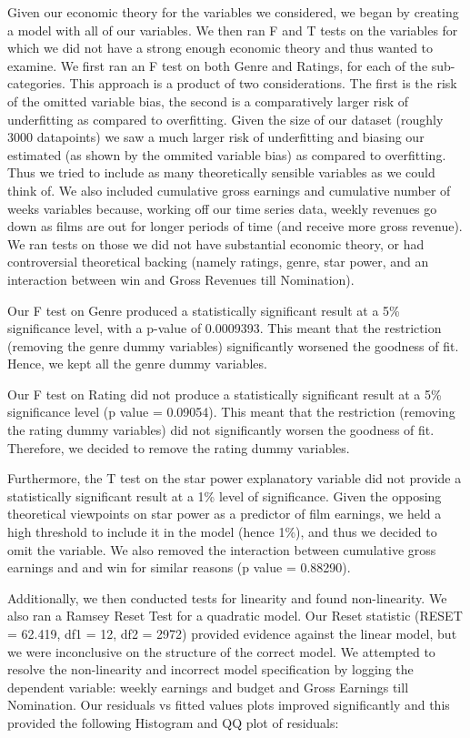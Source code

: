 \documentclass[10.7pt]{article} %
\begin{document}
Given our economic theory for the variables we considered, we began by creating a model with all of our variables. We then ran F and T tests on the variables for which we did not have a strong enough economic theory and thus wanted to examine. We first ran an F test on both Genre and Ratings, for each of the sub-categories. This approach is a product of two considerations. The first is the risk of the omitted variable bias, the second is a comparatively larger risk of underfitting as compared to overfitting. Given the size of our dataset (roughly 3000 datapoints) we saw a much larger risk of underfitting and biasing our estimated (as shown by the ommited variable bias) as compared to overfitting. Thus we tried to include as many theoretically sensible variables as we could think of. We also included cumulative gross earnings and cumulative number of weeks variables because, working off our time series data, weekly revenues go down as films are out for longer periods of time (and receive more gross revenue). We ran tests on those we did not have substantial economic theory, or had controversial theoretical backing  (namely ratings, genre, star power, and an interaction between win and Gross Revenues till Nomination).

Our F test on Genre produced a statistically significant result at a 5\% significance level, with a p-value of 0.0009393. This meant that the restriction (removing the genre dummy variables) significantly worsened the goodness of fit. Hence, we kept all the genre dummy variables. 

Our F test on Rating did not produce a statistically significant result at a 5\% significance level (p value = 0.09054). This meant that the restriction (removing the rating dummy variables) did not significantly worsen the goodness of fit. Therefore, we decided to remove the rating dummy variables. 

Furthermore, the T test on the star power explanatory variable did not provide a statistically significant result at a 1\% level of significance. Given the opposing theoretical viewpoints on star power as a predictor of film earnings, we held a high threshold to include it in the model (hence 1\%), and thus we decided to omit the variable. We also removed the interaction between cumulative gross earnings and and win for similar reasons (p value = 0.88290).

Additionally, we then conducted tests for linearity and found non-linearity. We also ran a Ramsey Reset Test for a quadratic model. Our Reset statistic (RESET = 62.419, df1 = 12, df2 = 2972) provided evidence against the linear model, but we were inconclusive on the structure of the correct model. We attempted to resolve the non-linearity and incorrect model specification by logging the dependent variable: weekly earnings and budget and Gross Earnings till Nomination. Our residuals vs fitted values plots improved significantly and this provided the following Histogram and QQ plot of residuals: 
\end{document}
